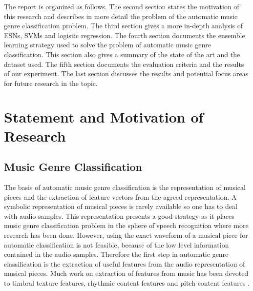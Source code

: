 \documentclass[a4paper,11pt,oneside]{article}
\begin{document}
The report is organized as follows. The second section states the motivation of this research
and describes in more detail the problem of the automatic music genre classification problem.
The third section gives a more in-depth analysis of ESNs, SVMs and logistic regression.
The fourth section documents the ensemble learning strategy used to solve the problem of automatic
music genre classification. This section also gives a summary of the state of the art and the dataset used.
The fifth section documents the evaluation criteria and the results of our experiment. The last section discusses the results and potential 
focus areas for future research in the topic.
\section{Statement and Motivation of Research}
\subsection{Music Genre Classification}
The basis of automatic music genre classification is the representation of musical pieces and the extraction
of feature vectors from the agreed representation. A symbolic representation of musical pieces is rarely available
so one has to deal with audio samples. This representation presents a good strategy as it places music genre 
classification problem in the sphere of speech recognition where more research has been done. However, using the
exact waveform of a musical piece for automatic classification is not feasible, because of the low level information 
contained in the audio samples. Therefore the first step in automatic genre classification is the extraction of useful 
features from the audio representation of musical pieces. Much work on extraction of features from music has been 
devoted to timbral texture features, rhythmic content features and pitch content features \cite{ogihara}.
\end{document}
